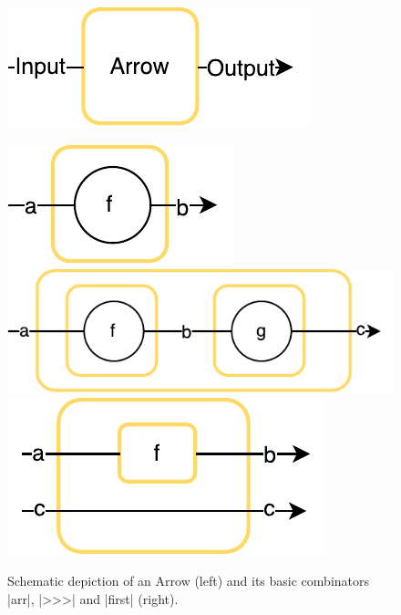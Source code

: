 \begin{figure}[t]
\centering
\parbox[c][17em]{0.49\linewidth}{%
\vfill
\centering
	\includegraphics{images/arrow}
\vfill
}
\parbox[c][17em]{0.49\linewidth}{%
\vfill
\centering
	{\includegraphics[scale=0.6]{images/arr}}
	{\includegraphics[scale=0.6]{images/compose}}
	{\includegraphics[scale=0.6]{images/first}}
\vfill
}
\caption{Schematic depiction of  an Arrow (left) and its basic
  combinators |arr|, |>>>| and |first| (right).}
\label{fig:arrow-sch}
\label{fig:arrows-viz}
\end{figure}

